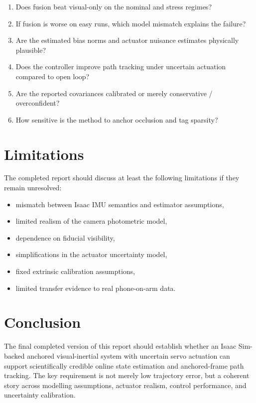 \documentclass[11pt]{article}
\begin{document}
\begin{enumerate}[leftmargin=1.5em]
    \item Does fusion beat visual-only on the nominal and stress regimes?
    \item If fusion is worse on easy runs, which model mismatch explains the failure?
    \item Are the estimated bias norms and actuator nuisance estimates physically plausible?
    \item Does the controller improve path tracking under uncertain actuation compared to open loop?
    \item Are the reported covariances calibrated or merely conservative / overconfident?
    \item How sensitive is the method to anchor occlusion and tag sparsity?
\end{enumerate}

\section{Limitations}
The completed report should discuss at least the following limitations if they remain unresolved:
\begin{itemize}[leftmargin=1.5em]
    \item mismatch between Isaac IMU semantics and estimator assumptions,
    \item limited realism of the camera photometric model,
    \item dependence on fiducial visibility,
    \item simplifications in the actuator uncertainty model,
    \item fixed extrinsic calibration assumptions,
    \item limited transfer evidence to real phone-on-arm data.
\end{itemize}

\section{Conclusion}
The final completed version of this report should establish whether an Isaac Sim-backed anchored visual-inertial system with uncertain servo actuation can support scientifically credible online state estimation and anchored-frame path tracking. The key requirement is not merely low trajectory error, but a coherent story across modelling assumptions, actuator realism, control performance, and uncertainty calibration.



\end{document}
